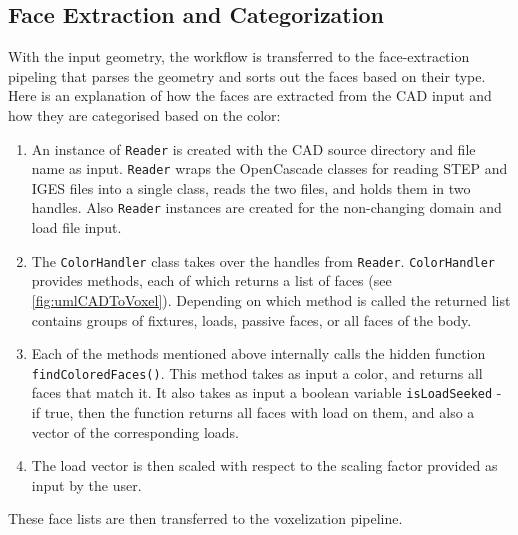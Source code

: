 \subsection{Face Extraction and Categorization}
\label{sec: FaceExtraction}

With the input geometry, the workflow is transferred to the face-extraction pipeling that parses the geometry and sorts out the faces based on their type. Here is an explanation of how the faces are extracted from the CAD input and how they are categorised based on the color:

\begin{enumerate}
	\item An instance of \lstinline|Reader| is created with the CAD source directory and file name as input. \lstinline|Reader| wraps the OpenCascade classes for reading STEP and IGES files into a single class, reads the two files, and holds them in two handles. Also \lstinline|Reader| instances are created for the non-changing domain and load file input.
	\item The \lstinline|ColorHandler| class takes over the handles from \lstinline|Reader|. \lstinline|ColorHandler| provides methods, each of which returns a list of faces (see \autoref{fig:umlCADToVoxel}). Depending on which method is called the returned list contains groups of fixtures, loads, passive faces, or all faces of the body.
	\item Each of the methods mentioned above internally calls the hidden function \lstinline|findColoredFaces()|. This method takes as input a color, and returns all faces that match it. It also takes as input a boolean variable \lstinline|isLoadSeeked| - if true, then the function returns all faces with load on them, and also a vector of the corresponding loads.
	\item The load vector is then scaled with respect to the scaling factor provided as input by the user.
\end{enumerate}

These face lists are then transferred to the voxelization pipeline.
